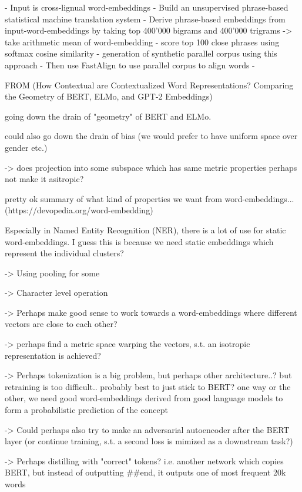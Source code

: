\documentclass[a4paper,12pt,twoside,openright]{report}
\begin{document}
- Input is cross-lignual word-embeddings
- Build an unsupervised phrase-based statistical machine translation system
- Derive phrase-based embeddings from input-word-embeddings by taking top 400'000 bigrams and 400'000 trigrams -> take arithmetic mean of word-embedding
- score top 100 close phrases using softmax cosine similarity
- generation of synthetic parallel corpus using this approach
- Then use FastAlign to use parallel corpus to align words
- 



FROM (How Contextual are Contextualized Word Representations? Comparing the Geometry of BERT, ELMo, and GPT-2 Embeddings)



going down the drain of "geometry" of BERT and ELMo.

could also go down the drain of bias (we would prefer to have uniform space over gender etc.)

-> does projection into some subspace which has same metric properties perhaps not make it asitropic?

pretty ok summary of what kind of properties we want from word-embeddings... (https://devopedia.org/word-embedding)


Especially in Named Entity Recognition (NER), there is a lot of use for static word-embeddings.
I guess this is because we need static embeddings which represent the individual clusters?

-> Using pooling for some 

-> Character level operation

-> Perhaps make good sense to work towards a word-embeddings where different vectors are close to each other?

-> perhaps find a metric space warping the vectors, s.t. an isotropic representation is achieved?

-> Perhaps tokenization is a big problem, but perhaps other architecture..? but retraining is too difficult.. probably best to just stick to BERT? one way or the other, we need good word-embeddings derived from good language models to form a probabilistic prediction of the concept


-> Could perhaps also try to make an adversarial autoencoder after the BERT layer (or continue training, s.t. a second loss is mimized as a downstream task?)

-> Perhaps distilling with "correct" tokens? i.e. another network which copies BERT, but instead of outputting ##end, it outputs one of most frequent 20k words
\end{document}
